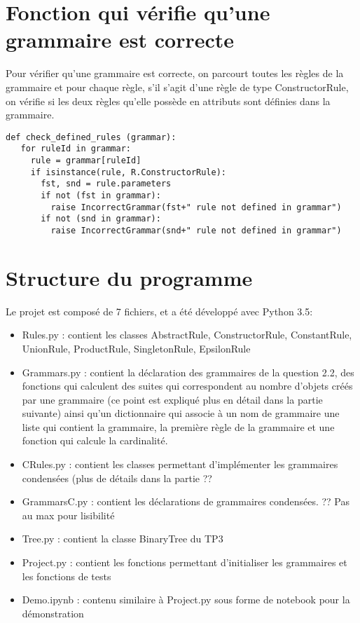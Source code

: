 \documentclass[a4paper, titlepage]{article}
\begin{document}
\section{Fonction qui vérifie qu'une grammaire est correcte}

Pour vérifier qu'une grammaire est correcte, on parcourt toutes les
règles de la grammaire et pour chaque règle, s'il s'agit d'une règle
de type ConstructorRule, on vérifie si les deux règles qu'elle possède
en attributs sont définies dans la grammaire.

\begin{lstlisting}
def check_defined_rules (grammar):
   for ruleId in grammar:
     rule = grammar[ruleId]
     if isinstance(rule, R.ConstructorRule):
       fst, snd = rule.parameters
       if not (fst in grammar):
         raise IncorrectGrammar(fst+" rule not defined in grammar")
       if not (snd in grammar):
         raise IncorrectGrammar(snd+" rule not defined in grammar")
\end{lstlisting}

\section {Structure du programme}

Le projet est composé de 7 fichiers, et a été développé avec Python 3.5:\\
\begin{itemize}
\item Rules.py : contient les classes AbstractRule, ConstructorRule,
  ConstantRule, UnionRule, ProductRule, SingletonRule, EpsilonRule\\
\item Grammars.py : contient la déclaration des grammaires de la
  question 2.2, des fonctions qui calculent des suites qui
  correspondent au nombre d'objets créés par une grammaire (ce point
  est expliqué plus en détail dans la partie suivante) ainsi qu'un dictionnaire qui associe à un nom de
  grammaire une liste qui contient la grammaire, la première règle de
  la grammaire et une fonction qui calcule la cardinalité.\\
\item CRules.py : contient les classes permettant d'implémenter les
  grammaires condensées (plus de détails dans la partie ??\\
\item GrammarsC.py : contient les déclarations de grammaires
  condensées. ?? Pas au max pour lisibilité\\
\item Tree.py : contient la classe BinaryTree du TP3\\
\item Project.py : contient les fonctions permettant d'initialiser les
  grammaires et les fonctions de tests\\
\item Demo.ipynb : contenu similaire à Project.py sous forme de
  notebook pour la démonstration\\
  
\end{itemize}
\end{document}
